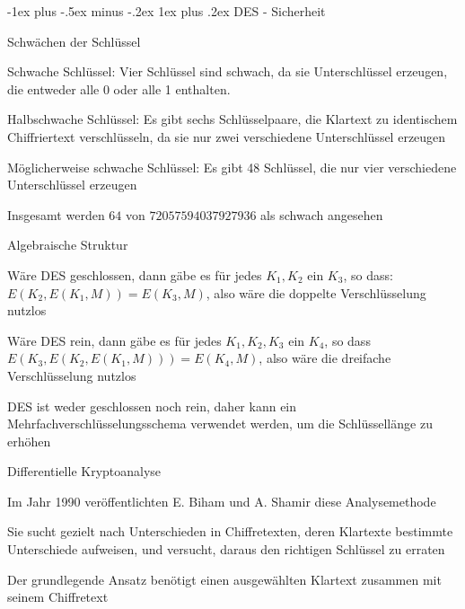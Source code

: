 \documentclass[a4paper]{article}
\makeatletter
\renewcommand{\subsubsection}{\@startsection{subsubsection}{3}{0mm}%
 {-1ex plus -.5ex minus -.2ex}%
 {1ex plus .2ex}%
 {\normalfont\small\bfseries}}
\makeatother
\begin{document}
\begin{multicols}{3}
      \subsubsection{DES - Sicherheit}
      \begin{itemize*}
            \item Schwächen der Schlüssel
            \begin{itemize*}
                  \item Schwache Schlüssel: Vier Schlüssel sind schwach, da sie Unterschlüssel erzeugen, die entweder alle 0 oder alle 1 enthalten.
                  \item Halbschwache Schlüssel: Es gibt sechs Schlüsselpaare, die Klartext zu identischem Chiffriertext verschlüsseln, da sie nur zwei verschiedene Unterschlüssel erzeugen
                  \item Möglicherweise schwache Schlüssel: Es gibt 48 Schlüssel, die nur vier verschiedene Unterschlüssel erzeugen
                  \item Insgesamt werden $64$ von $72057594037927936$ als schwach angesehen
            \end{itemize*}
            \item Algebraische Struktur
            \begin{itemize*}
                  \item Wäre DES geschlossen, dann gäbe es für jedes $K_1,K_2$ ein $K_3$, so dass: $E(K_2,E(K_1,M))=E(K_3,M)$, also wäre die doppelte Verschlüsselung nutzlos
                  \item Wäre DES rein, dann gäbe es für jedes $K_1,K_2,K_3$ ein $K_4$, so dass $E(K_3,E(K_2,E(K_1,M)))=E(K_4,M)$, also wäre die dreifache Verschlüsselung nutzlos
                  \item DES ist weder geschlossen noch rein, daher kann ein Mehrfachverschlüsselungsschema verwendet werden, um die Schlüssellänge zu erhöhen
            \end{itemize*}
            \item Differentielle Kryptoanalyse
            \begin{itemize*}
                  \item Im Jahr 1990 veröffentlichten E. Biham und A. Shamir diese Analysemethode
                  \item Sie sucht gezielt nach Unterschieden in Chiffretexten, deren Klartexte bestimmte Unterschiede aufweisen, und versucht, daraus den richtigen Schlüssel zu erraten
                  \item Der grundlegende Ansatz benötigt einen ausgewählten Klartext zusammen mit seinem Chiffretext

\end{itemize*}
\end{itemize*}
\end{multicols}
\end{document}
